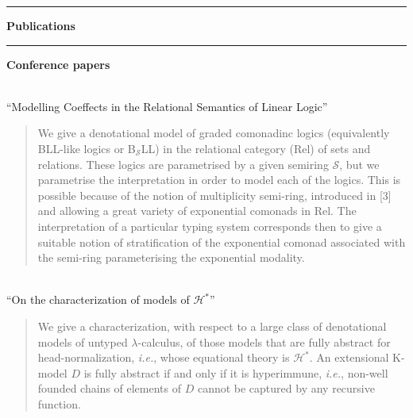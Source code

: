 \documentclass{article}[11pt]
\newcommand\sS{\mathcal S}
\begin{document}
\noindent \rule{5.5em}{7pt} {\large \bf Publications}  \nobreak \\
\noindent \rule{5.5em}{1pt} {\bf Conference papers}  \nobreak
\begin{itemize}[itemindent=0em,leftmargin=6em, labelsep=1em]
\\ ``Modelling Coeffects in the Relational Semantics of Linear Logic''\vspace{-0.5em}
\begin{quote}
  We give a denotational model of graded comonadinc logics (equivalently BLL-like logics or B$_\sS$LL) in the relational category (Rel) of sets and relations. These logics are parametrised by a given semiring $\sS$, but we parametrise the interpretation in order to model each of the logics. This is possible because of the notion of multiplicity semi-ring, introduced in [3] and  allowing a great variety of exponential comonads in Rel. The interpretation of a particular typing system corresponds then to give a suitable notion of stratification of the exponential comonad associated with the semi-ring parameterising the exponential modality.
\end{quote}
\\ ``On the characterization of models of $\mathcal{H}^*$''\vspace{-0.5em}
\begin{quote}
  We give a characterization, with respect to a large class of denotational models of untyped $\lambda$-calculus, of those models that are fully abstract for head-normalization, {\em i.e.}, whose equational theory is $\mathcal{H}^*$. An extensional K-model $D$ is fully abstract if and only if it is hyperimmune, {\em i.e.}, non-well founded chains of elements of $D$ cannot be captured by any recursive function.


\end{quote}
\end{itemize}
\end{document}
